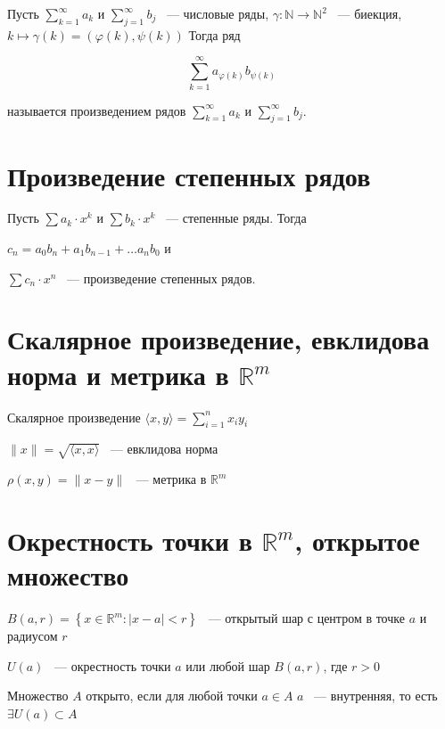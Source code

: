 \documentclass{article}
\begin{document}
        Пусть $\sum\limits^{\infty}_{k = 1} a_k$ и $\sum\limits^{\infty}_{j = 1} b_j$ ~--- числовые ряды, $\gamma : \mathbb{N} \rightarrow \mathbb{N}^2$ ~--- биекция, $k \mapsto \gamma(k) = (\varphi(k), \psi(k))$ Тогда ряд
        
        $$\sum\limits^{\infty}_{k = 1} a_{\varphi(k)} b_{\psi(k)}$$
        
        называется произведением рядов $\sum\limits^{\infty}_{k = 1} a_k$ и $\sum\limits^{\infty}_{j = 1} b_j$.
        
    \newpage
    
    \section{Произведение степенных рядов}
    
        Пусть $\sum a_k \cdot x^k$ и $\sum b_k \cdot x^k$ ~--- степенные ряды. Тогда 
        
        $c_n = a_0 b_n + a_1 b_{n - 1} + \ldots a_n b_0$ и 
        
        $\sum c_n \cdot x^n$ ~--- произведение степенных рядов.
        
    \newpage
    
    \section{Скалярное произведение, евклидова норма и метрика в $\mathbb{R}^m$}
    
        Скалярное произведение $\langle x, y \rangle = \sum\limits^n_{i = 1} x_i y_i$
        
        $\| x \| = \sqrt{\langle x, x \rangle}$ ~--- евклидова норма
        
        $\rho(x, y) = \| x - y \|$ ~--- метрика в $\mathbb{R}^m$
        
    \newpage
    
    \section{Окрестность точки в $\mathbb{R}^m$, открытое множество}
    
        $B(a, r) = \left\{ x \in \mathbb{R}^m : | x - a | < r \right\}$ ~--- открытый шар с центром в точке $a$ и радиусом $r$
        
        $U(a)$ ~--- окрестность точки $a$ или любой шар $B(a, r)$, где $r > 0$
        
        Множество $A$ открыто, если для любой точки $a \in A$ $a$ ~--- внутренняя, то есть $\exists U(a) \subset A$
        
\end{document}
